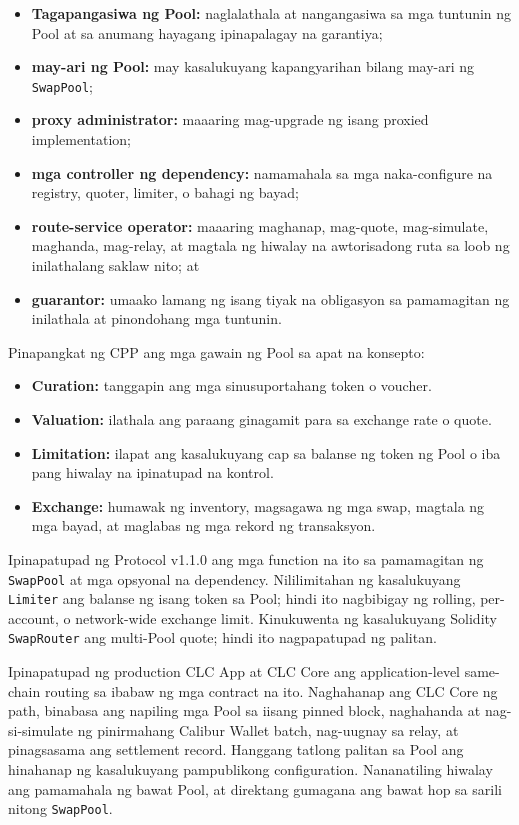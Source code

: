 \documentclass[11pt]{article}
\begin{document}
\begin{itemize}[leftmargin=*]
\item \textbf{Tagapangasiwa ng Pool:} naglalathala at nangangasiwa sa mga tuntunin ng Pool at sa anumang hayagang ipinapalagay na garantiya;
\item \textbf{may-ari ng Pool:} may kasalukuyang kapangyarihan bilang may-ari ng \texttt{SwapPool};
\item \textbf{proxy administrator:} maaaring mag-upgrade ng isang proxied implementation;
\item \textbf{mga controller ng dependency:} namamahala sa mga naka-configure na registry, quoter, limiter, o bahagi ng bayad;
\item \textbf{route-service operator:} maaaring maghanap, mag-quote, mag-simulate, maghanda, mag-relay, at magtala ng hiwalay na awtorisadong ruta sa loob ng inilathalang saklaw nito; at
\item \textbf{guarantor:} umaako lamang ng isang tiyak na obligasyon sa pamamagitan ng inilathala at pinondohang mga tuntunin.
\end{itemize}
Pinapangkat ng CPP ang mga gawain ng Pool sa apat na konsepto:

\begin{itemize}[leftmargin=*]
\item \textbf{Curation:} tanggapin ang mga sinusuportahang token o voucher.
\item \textbf{Valuation:} ilathala ang paraang ginagamit para sa exchange rate o quote.
\item \textbf{Limitation:} ilapat ang kasalukuyang cap sa balanse ng token ng Pool o iba pang hiwalay na ipinatupad na kontrol.
\item \textbf{Exchange:} humawak ng inventory, magsagawa ng mga swap, magtala ng mga bayad, at maglabas ng mga rekord ng transaksyon.
\end{itemize}
Ipinapatupad ng Protocol v1.1.0 ang mga function na ito sa pamamagitan ng \texttt{SwapPool} at mga opsyonal na dependency. Nililimitahan ng kasalukuyang \texttt{Limiter} ang balanse ng isang token sa Pool; hindi ito nagbibigay ng rolling, per-account, o network-wide exchange limit. Kinukuwenta ng kasalukuyang Solidity \texttt{SwapRouter} ang multi-Pool quote; hindi ito nagpapatupad ng palitan.

Ipinapatupad ng production CLC App at CLC Core ang application-level same-chain routing sa ibabaw ng mga contract na ito. Naghahanap ang CLC Core ng path, binabasa ang napiling mga Pool sa iisang pinned block, naghahanda at nag-si-simulate ng pinirmahang Calibur Wallet batch, nag-uugnay sa relay, at pinagsasama ang settlement record. Hanggang tatlong palitan sa Pool ang hinahanap ng kasalukuyang pampublikong configuration. Nananatiling hiwalay ang pamamahala ng bawat Pool, at direktang gumagana ang bawat hop sa sarili nitong \texttt{SwapPool}.
\end{document}
